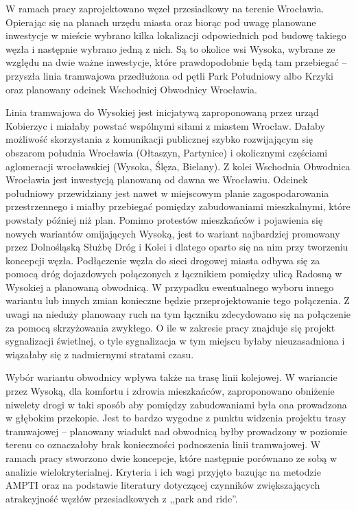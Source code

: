\documentclass[twoside,12pt]{article}
\begin{document}
		W ramach pracy zaprojektowano węzeł przesiadkowy na terenie Wrocławia. Opierając się na planach urzędu miasta oraz biorąc pod uwagę planowane inwestycje w mieście wybrano kilka lokalizacji odpowiednich pod budowę takiego węzła i następnie wybrano jedną z nich. Są to okolice wsi Wysoka, wybrane ze względu na dwie ważne inwestycje, które prawdopodobnie będą tam przebiegać -- przyszła linia tramwajowa przedłużona od pętli Park Południowy albo Krzyki oraz planowany odcinek Wschodniej Obwodnicy Wrocławia.
		
		Linia tramwajowa do Wysokiej jest inicjatywą zaproponowaną przez urząd Kobierzyc i miałaby powstać wspólnymi siłami z miastem Wrocław. Dałaby możliwość skorzystania z komunikacji publicznej szybko rozwijającym się obszarom południa Wrocławia (Ołtaszyn, Partynice) i okolicznymi częściami aglomeracji wrocławskiej (Wysoka, Ślęza, Bielany). Z kolei Wschodnia Obwodnica Wrocławia jest inwestycją planowaną od dawna we Wrocławiu. Odcinek południowy przewidziany jest nawet w miejscowym planie zagospodarowania przestrzennego i miałby przebiegać pomiędzy zabudowaniami mieszkalnymi, które powstały później niż plan. Pomimo protestów mieszkańców i pojawienia się nowych wariantów omijających Wysoką, jest to wariant najbardziej promowany przez Dolnośląską Służbę Dróg i Kolei i dlatego oparto się na nim przy tworzeniu koncepcji węzła. Podłączenie węzła do sieci drogowej miasta odbywa się za pomocą dróg dojazdowych połączonych z łącznikiem pomiędzy ulicą Radosną w Wysokiej a planowaną obwodnicą. W przypadku ewentualnego wyboru innego wariantu lub innych zmian konieczne będzie przeprojektowanie tego połączenia. Z uwagi na nieduży planowany ruch na tym łączniku zdecydowano się na połączenie za pomocą skrzyżowania zwykłego. O ile w zakresie pracy znajduje się projekt sygnalizacji świetlnej, o tyle sygnalizacja w tym miejscu byłaby nieuzasadniona i wiązałaby się z nadmiernymi stratami czasu. 
		
		Wybór wariantu obwodnicy wpływa także na trasę linii kolejowej. W wariancie przez Wysoką, dla komfortu i zdrowia mieszkańców, zaproponowano obniżenie niwelety drogi w taki sposób aby pomiędzy zabudowaniami była ona prowadzona w głębokim przekopie. Jest to bardzo wygodne z punktu widzenia projektu trasy tramwajowej -- planowany wiadukt nad obwodnicą byłby prowadzony w poziomie terenu co oznaczałoby brak konieczności podnoszenia linii tramwajowej. W ramach pracy stworzono dwie koncepcje, które następnie porównano ze sobą w analizie wielokryterialnej. Kryteria i ich wagi przyjęto bazując na metodzie AMPTI oraz na podstawie literatury dotyczącej czynników zwiększających atrakcyjność węzłów przesiadkowych z ,,park and ride''. 
		
\end{document}
